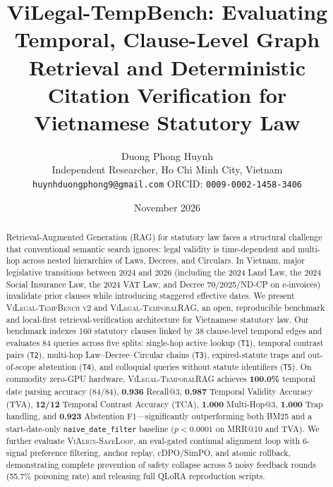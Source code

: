 \documentclass[11pt,a4paper]{article}
\title{\textbf{ViLegal-TempBench: Evaluating Temporal, Clause-Level Graph Retrieval and Deterministic Citation Verification for Vietnamese Statutory Law}}
\author{
  Duong Phong Huynh \\
  Independent Researcher, Ho Chi Minh City, Vietnam \\
  \texttt{huynhduongphong9@gmail.com} \quad ORCID: \texttt{0009-0002-1458-3406}
}
\date{November 2026}
\begin{document}
\maketitle

\begin{abstract}
Retrieval-Augmented Generation (RAG) for statutory law faces a structural challenge that conventional semantic search ignores: legal validity is time-dependent and multi-hop across nested hierarchies of Laws, Decrees, and Circulars. In Vietnam, major legislative transitions between 2024 and 2026 (including the 2024 Land Law, the 2024 Social Insurance Law, the 2024 VAT Law, and Decree 70/2025/ND-CP on e-invoices) invalidate prior clauses while introducing staggered effective dates. We present \textsc{ViLegal-TempBench v2} and \textsc{ViLegal-TemporalRAG}, an open, reproducible benchmark and local-first retrieval-verification architecture for Vietnamese statutory law. Our benchmark indexes 160 statutory clauses linked by 38 clause-level temporal edges and evaluates 84 queries across five splits: single-hop active lookup (\texttt{T1}), temporal contrast pairs (\texttt{T2}), multi-hop Law--Decree--Circular chains (\texttt{T3}), expired-statute traps and out-of-scope abstention (\texttt{T4}), and colloquial queries without statute identifiers (\texttt{T5}). On commodity zero-GPU hardware, \textsc{ViLegal-TemporalRAG} achieves \textbf{100.0\%} temporal date parsing accuracy (84/84), \textbf{0.936} Recall@3, \textbf{0.987} Temporal Validity Accuracy (TVA), \textbf{12/12} Temporal Contrast Accuracy (TCA), \textbf{1.000} Multi-Hop@3, \textbf{1.000} Trap handling, and \textbf{0.923} Abstention F1---significantly outperforming both BM25 and a start-date-only \texttt{naive\_date\_filter} baseline ($p < 0.0001$ on MRR@10 and TVA). We further evaluate \textsc{ViAlign-SafeLoop}, an eval-gated continual alignment loop with 6-signal preference filtering, anchor replay, cDPO/SimPO, and atomic rollback, demonstrating complete prevention of safety collapse across 5 noisy feedback rounds (55.7\% poisoning rate) and releasing full QLoRA reproduction scripts.
\end{abstract}
\end{document}
